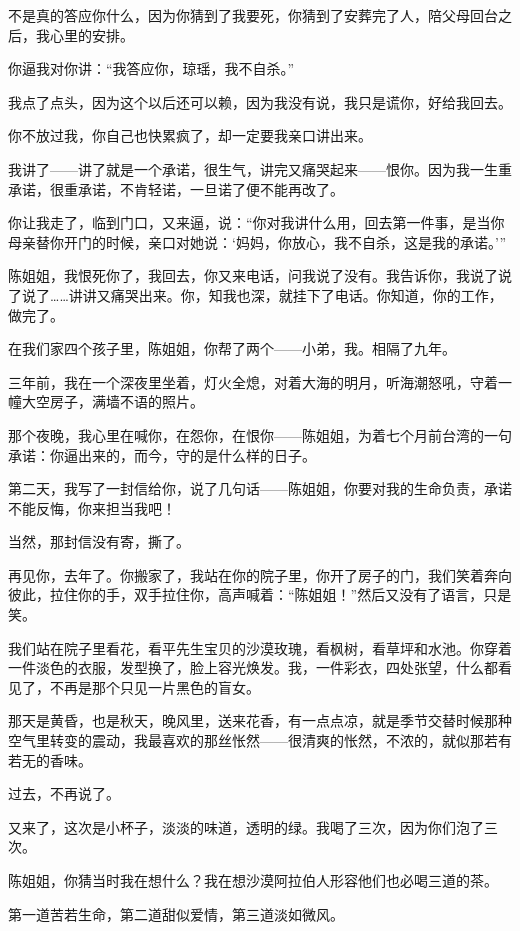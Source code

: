 \par 不是真的答应你什么，因为你猜到了我要死，你猜到了安葬完了人，陪父母回台之后，我心里的安排。
\par 你逼我对你讲：“我答应你，琼瑶，我不自杀。”
\par 我点了点头，因为这个以后还可以赖，因为我没有说，我只是谎你，好给我回去。
\par 你不放过我，你自己也快累疯了，却一定要我亲口讲出来。
\par 我讲了——讲了就是一个承诺，很生气，讲完又痛哭起来——恨你。因为我一生重承诺，很重承诺，不肯轻诺，一旦诺了便不能再改了。
\par 你让我走了，临到门口，又来逼，说：“你对我讲什么用，回去第一件事，是当你母亲替你开门的时候，亲口对她说：‘妈妈，你放心，我不自杀，这是我的承诺。’”
\par 陈姐姐，我恨死你了，我回去，你又来电话，问我说了没有。我告诉你，我说了说了说了……讲讲又痛哭出来。你，知我也深，就挂下了电话。你知道，你的工作，做完了。
\par 在我们家四个孩子里，陈姐姐，你帮了两个——小弟，我。相隔了九年。
\par 三年前，我在一个深夜里坐着，灯火全熄，对着大海的明月，听海潮怒吼，守着一幢大空房子，满墙不语的照片。
\par 那个夜晚，我心里在喊你，在怨你，在恨你——陈姐姐，为着七个月前台湾的一句承诺：你逼出来的，而今，守的是什么样的日子。
\par 第二天，我写了一封信给你，说了几句话——陈姐姐，你要对我的生命负责，承诺不能反悔，你来担当我吧！
\par 当然，那封信没有寄，撕了。
\par 再见你，去年了。你搬家了，我站在你的院子里，你开了房子的门，我们笑着奔向彼此，拉住你的手，双手拉住你，高声喊着：“陈姐姐！”然后又没有了语言，只是笑。
\par 我们站在院子里看花，看平先生宝贝的沙漠玫瑰，看枫树，看草坪和水池。你穿着一件淡色的衣服，发型换了，脸上容光焕发。我，一件彩衣，四处张望，什么都看见了，不再是那个只见一片黑色的盲女。
\par 那天是黄昏，也是秋天，晚风里，送来花香，有一点点凉，就是季节交替时候那种空气里转变的震动，我最喜欢的那丝怅然——很清爽的怅然，不浓的，就似那若有若无的香味。
\par 过去，不再说了。
\par 又来了，这次是小杯子，淡淡的味道，透明的绿。我喝了三次，因为你们泡了三次。
\par 陈姐姐，你猜当时我在想什么？我在想沙漠阿拉伯人形容他们也必喝三道的茶。
\par 第一道苦若生命，第二道甜似爱情，第三道淡如微风。

